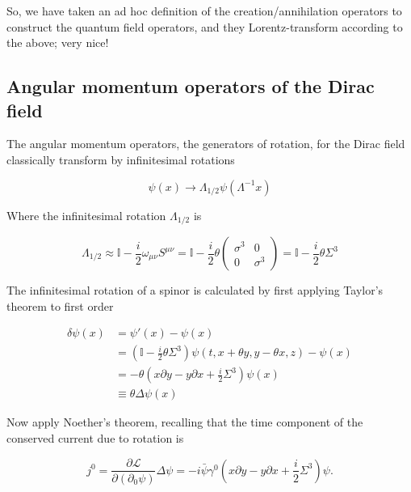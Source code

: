 \noindent So, we have taken an ad hoc definition of the creation/annihilation operators to construct the quantum field operators, and they Lorentz-transform according to the above; very nice!

\subsection*{Angular momentum operators of the Dirac field}

\noindent The angular momentum operators, the generators of rotation, for the Dirac field classically transform by infinitesimal rotations

\begin{equation}
\psi (x) \rightarrow \Lambda_{1/2} \psi (\Lambda^{-1} x)
\end{equation}

\noindent Where the infinitesimal rotation $\Lambda_{1/2}$ is

\begin{equation}
\Lambda_{1/2} \approx \mathbb{I} - \frac{i}{2} \omega_{\mu \nu} S^{\mu \nu} = \mathbb{I} - \frac{i}{2} \theta \left( \begin{array}{cc} \sigma^3 & 0 \\ 0 & \sigma^3 \end{array} \right) = \mathbb{I} - \frac{i}{2} \theta \Sigma^3
\end{equation}

\noindent The infinitesimal rotation of a spinor is calculated by first applying Taylor's theorem to first order

\begin{align}
\delta \psi (x) &= \psi' (x) - \psi (x) \\
&= (\mathbb{I} - \frac{i}{2} \theta \Sigma^3) \psi(t, x+\theta y, y - \theta x, z) - \psi(x) \\
&= -\theta (x \partial y - y \partial x + \frac{i}{2} \Sigma^3 ) \psi(x) \\
&\equiv \theta \Delta \psi(x)
\end{align}

\noindent Now apply Noether's theorem, recalling that the time component of the conserved current due to rotation is 

\begin{equation}
j^0 = \frac{\partial \mathcal{L}}{\partial ( \partial_0 \psi)} \Delta \psi = -i \bar{\psi} \gamma^0 (x \partial y - y \partial x + \frac{i}{2} \Sigma^3 ) \psi .
\end{equation}

